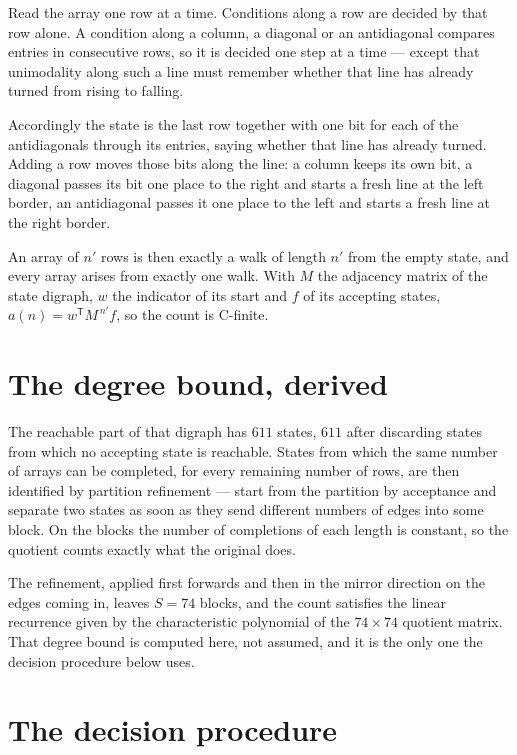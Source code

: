 \documentclass[11pt]{article}
\theoremstyle{definition}
\begin{document}
Read the array one row at a time. Conditions along a row are decided by that row alone. A condition along a column, a diagonal or an antidiagonal compares entries in consecutive rows, so it is decided one step at a time --- except that unimodality along such a line must remember whether that line has already turned from rising to falling.

Accordingly the state is the last row together with one bit for each of the antidiagonals through its entries, saying whether that line has already turned. Adding a row moves those bits along the line: a column keeps its own bit, a diagonal passes its bit one place to the right and starts a fresh line at the left border, an antidiagonal passes it one place to the left and starts a fresh line at the right border.

An array of $n'$ rows is then exactly a walk of length $n'$ from the empty state, and every array arises from exactly one walk. With $M$ the adjacency matrix of the state digraph, $w$ the indicator of its start and $f$ of its accepting states, $a(n) = w^{\mathsf T}M^{\,n'}f$, so the count is C-finite.

\section{The degree bound, derived}

The reachable part of that digraph has $611$ states, $611$ after discarding states from which no accepting state is reachable. States from which the same number of arrays can be completed, for every remaining number of rows, are then identified by partition refinement --- start from the partition by acceptance and separate two states as soon as they send different numbers of edges into some block. On the blocks the number of completions of each length is constant, so the quotient counts exactly what the original does.

The refinement, applied first forwards and then in the mirror direction on the edges coming in, leaves $S = 74$ blocks, and the count satisfies the linear recurrence given by the characteristic polynomial of the $74 \times 74$ quotient matrix. That degree bound is computed here, not assumed, and it is the only one the decision procedure below uses.

\section{The decision procedure}
\end{document}
